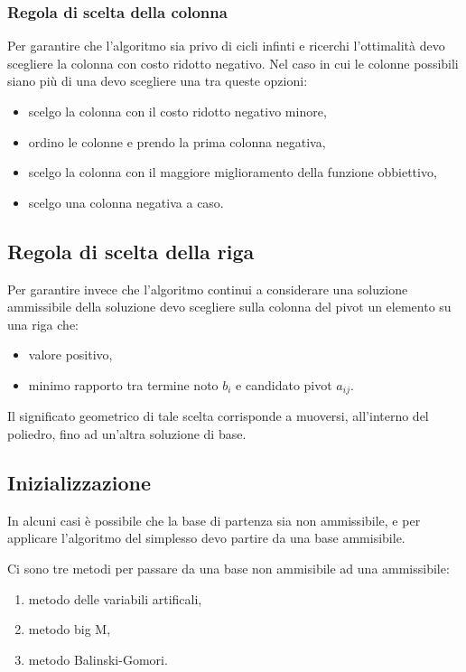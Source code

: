 \subsubsection{Regola di scelta della colonna}
Per garantire che l'algoritmo sia privo di cicli infinti e ricerchi l'ottimalità devo scegliere la colonna con costo ridotto negativo. 
Nel caso in cui le colonne possibili siano più di una devo scegliere una tra queste opzioni:
\begin{itemize}
	\item scelgo la colonna con il costo ridotto negativo minore,
	\item ordino le colonne e prendo la prima colonna negativa,
	\item scelgo la colonna con il maggiore miglioramento della funzione obbiettivo,
	\item scelgo una colonna negativa a caso. 
\end{itemize}

\subsection{Regola di scelta della riga}
Per garantire invece che l'algoritmo continui a considerare una soluzione ammissibile della soluzione devo scegliere sulla colonna del pivot un elemento su una riga che:
\begin{itemize}
	\item valore positivo,
	\item minimo rapporto tra termine noto $b_i$ e candidato pivot $a_{ij}$.
\end{itemize}

Il significato geometrico di tale scelta corrisponde a muoversi, all'interno del poliedro, fino ad un'altra soluzione di base.

\subsection{Inizializzazione}

In alcuni casi è possibile che la base di partenza sia non ammissibile, e per applicare l'algoritmo del simplesso devo partire da una base ammisibile. 

Ci sono tre metodi per passare da una base non ammisibile ad una ammissibile:

\begin{enumerate}
	\item metodo delle variabili artificali,
	\item metodo big M,
	\item metodo Balinski-Gomori.
\end{enumerate}

